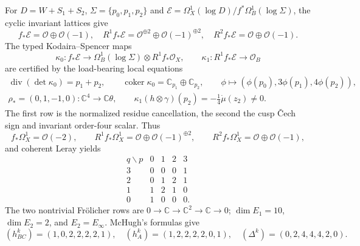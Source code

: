 \documentclass[10pt,letterpaper]{article}
\begin{document}
For $D=W+S_1+S_2$, $\Sigma=\{p_0,p_1,p_2\}$ and
$\mathcal E=\Omega_X^1(\log D)/f^*\Omega_B^1(\log\Sigma)$, the cyclic
invariant lattices give
\[
 f_*\mathcal E=\mathcal O\oplus\mathcal O(-1),\quad
 R^1f_*\mathcal E=\mathcal O^{\oplus2}\oplus\mathcal O(-1)^{\oplus2},\quad
 R^2f_*\mathcal E=\mathcal O\oplus\mathcal O(-1).
\]
The typed Kodaira--Spencer maps
\[
 \kappa_0:f_*\mathcal E\to
 \Omega_B^1(\log\Sigma)\otimes R^1f_*\mathcal O_X,\qquad
 \kappa_1:R^1f_*\mathcal E\to\mathcal O_B
\]
are certified by the load-bearing local equations
\[
 \begin{gathered}
 \operatorname{div}(\det\kappa_0)=p_1+p_2,\qquad
 \operatorname{coker}\kappa_0=\mathbb C_{p_1}\oplus\mathbb C_{p_2},\qquad
 \phi\longmapsto(\phi(p_0),3\phi(p_1),4\phi(p_2)),\\
 \rho_*=(0,1,-1,0):\mathbb C^4\to\mathbb C\theta,\qquad
 \kappa_1(h\otimes\gamma)(p_2)=-\tfrac14\dot\mu(z_2)\ne0.
 \end{gathered}
\]
The first row is the normalized residue cancellation, the second the cusp
Čech sign and invariant order-four scalar.  Thus
\[
 f_*\Omega_X^1=\mathcal O(-2),\qquad
 R^1f_*\Omega_X^1=\mathcal O\oplus\mathcal O(-1)^{\oplus2},\qquad
 R^2f_*\Omega_X^1=\mathcal O\oplus\mathcal O(-1),
\]
and coherent Leray yields
\[
\begin{array}{c|cccc}
q\backslash p&0&1&2&3\\ \hline
3&0&0&0&1\\2&0&1&2&1\\1&1&2&1&0\\0&1&0&0&0.
\end{array}
\]
The two nontrivial Fr\"olicher rows are
$0\to\mathbb C\to\mathbb C^2\to\mathbb C\to0$;
$\dim E_1=10$, $\dim E_2=2$, and $E_2=E_\infty$.  McHugh's formulas give
\[
 (h^k_{BC})=(1,0,2,2,2,2,1),\quad
 (h^k_A)=(1,2,2,2,2,0,1),\quad
 (\Delta^k)=(0,2,4,4,4,2,0).
\]
\end{document}
